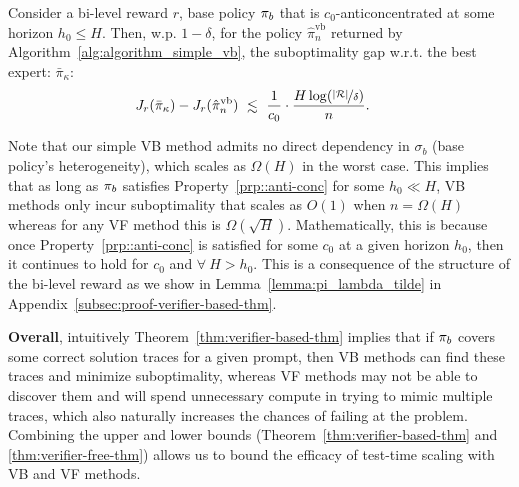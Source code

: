 {
\begin{tcolorbox}[colback=red!6!white,colframe=black,boxsep=0pt,top=4pt,bottom=4pt,left=3pt,right=3pt]
\begin{theorem}
\label{thm:verifier-based-thm}
Consider a bi-level
reward $r$,  base policy $\pi_b$ that is $c_0$-anticoncentrated  at some horizon $h_0 \leq H$. Then, w.p. $1-\delta$, for the policy $\hat{\pi}_n^{\mathrm{vb}}$ returned by Algorithm~\ref{alg:algorithm_simple_vb}, 
the suboptimality gap w.r.t. the best expert:  $\bar{\pi}_\kappa$:
{   \setlength{\abovedisplayskip}{3pt}
    \setlength{\belowdisplayskip}{3pt}
    \begin{align*}   
      &J_r(\bar{\pi}_\kappa) - J_r(\hat{\pi}_{n}^\mathrm{vb}) \; \lsim \;  \frac{1}{c_0} \cdot \frac{H\log(\nicefrac{|\gR|}{\delta})}{n}.
    \end{align*}
}  
\end{theorem}
\end{tcolorbox}
}
\vspace{-0.1cm}
Note that our simple VB method admits no direct dependency in $\sigma_b$ (base policy's heterogeneity), which scales as $\Omega(H)$ in the worst case. This implies that as long as $\pi_b$ satisfies Property~\ref{prp::anti-conc} for some $h_0 \ll H$,  VB methods only incur suboptimality that scales as $O(1)$ when $n=\Omega(H)$ whereas for any VF method this is $\Omega(\sqrt{H})$. Mathematically, this is because once Property~\ref{prp::anti-conc} is satisfied for some $c_0$ at a given horizon $h_0$, then it continues to hold for $c_0$ and $\forall~ H > h_0$. This is a consequence of the structure of the bi-level reward as we show in Lemma~\ref{lemma:pi_lambda_tilde} in Appendix~\ref{subsec:proof-verifier-based-thm}. 

\textbf{Overall}, intuitively Theorem~\ref{thm:verifier-based-thm} implies that if $\pi_b$ covers some correct solution traces for a given prompt, then VB methods can find these traces and minimize suboptimality, whereas VF methods may not be able to discover them and will spend unnecessary compute in trying to mimic multiple traces, which also naturally increases the chances of failing at the problem. Combining the upper and lower bounds (Theorem~\ref{thm:verifier-based-thm} and \ref{thm:verifier-free-thm}) allows us to bound the efficacy of test-time scaling with VB and VF methods.





